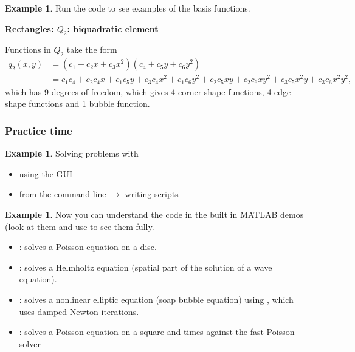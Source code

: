 \documentclass[12pt, a4paper]{article}
\theoremstyle{definition}
\newtheorem{example}[thm]{Example}
\theoremstyle{remark}
\numberwithin{equation}{section}
\begin{document}
\begin{example} 
Run the code  to see examples of the basis functions.
\end{example}

\newpage
{\bf Rectangles:  $Q_2$: biquadratic element}

Functions in $Q_2$ take the form
\begin{align*}
q_2(x,y)&=(c_1+c_2x+c_3x^2)(c_4+c_5y+c_6y^2)\\ 
      &=c_1c_4+c_2 c_4 x + c_1 c_5y+c_3 c_4 x^2+c_1c_6y^2 + c_2 c_5 xy + c_2 c_6 xy^2 + c_3 c_5 x^2y + c_3 c_6 x^2 y^2,
\end{align*}
which has 9 degrees of freedom, which gives 4 corner shape functions, 4 edge shape functions and 1 bubble function.


\newpage
\subsubsection{Practice time}

\begin{example} 
Solving problems with 
\begin{itemize}
\item using the GUI
\item from the command line $\to$ writing scripts 
\end{itemize}
\end{example}

\begin{example} 
Now you can understand the code in the built in MATLAB demos (look at them and use  to see them fully.

\begin{itemize}
\item {}: solves a Poisson equation on a disc.
\item {}: solves a Helmholtz equation (spatial part of 
the solution of a wave equation).
\item {}: solves a nonlinear elliptic equation (soap bubble equation) using 
, which uses damped Newton iterations.
\item {}: solves a Poisson equation on a square and times  against the fast Poisson solver 
\end{itemize}

\end{example}
\end{document}
